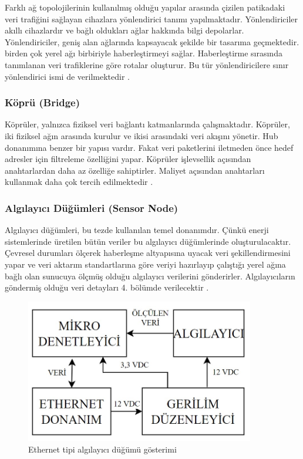 Farklı ağ topolojilerinin kullanılmış olduğu yapılar arasında çizilen patikadaki veri trafiğini sağlayan cihazlara yönlendirici tanımı yapılmaktadır. Yönlendiriciler akıllı cihazlardır ve bağlı oldukları ağlar hakkında bilgi depolarlar. Yönlendiriciler, geniş alan ağlarında kapsayacak şekilde bir tasarıma geçmektedir. birden çok yerel ağı birbiriyle haberleştirmeyi sağlar. Haberleştirme sırasında tanımlanan veri trafiklerine göre rotalar oluşturur. Bu tür yönlendiricilere sınır yönlendirici ismi de verilmektedir  \cite{parziale_2006}.

\subsubsection{Köprü (Bridge)}


Köprüler, yalnızca fiziksel veri bağlantı katmanlarında çalışmaktadır. Köprüler, iki fiziksel ağın arasında kurulur ve ikisi arasındaki veri akışını yönetir. Hub donanımına benzer bir yapısı vardır. Fakat veri paketlerini iletmeden önce hedef adresler için filtreleme özelliğini yapar. Köprüler işlevsellik açısından anahtarlardan daha az özelliğe sahiptirler. Maliyet açısından anahtarları kullanmak daha çok tercih edilmektedir \cite{parziale_2006}.


\subsubsection{Algılayıcı Düğümleri (Sensor Node)}\label{algilayicidugum}

Algılayıcı düğümleri, bu tezde kullanılan temel donanımdır. Çünkü enerji sistemlerinde üretilen bütün veriler bu algılayıcı düğümlerinde oluşturulacaktır. Çevresel durumları ölçerek haberleşme altyapısına uyacak veri şekillendirmesini yapar ve veri aktarım standartlarına göre veriyi hazırlayıp çalıştığı yerel ağına bağlı olan sunucuya ölçmüş olduğu algılayıcı verilerini gönderirler. Algılayıcıların göndermiş olduğu veri detayları 4. bölümde verilecektir \cite{parziale_2006}.

\begin{figure}[htbp]
\centerline{\includegraphics[width=10cm]{Resim/sekil3-3.jpg}}
\caption{Ethernet tipi algılayıcı düğümü gösterimi}
\label{fig:figure9}
\end{figure}

